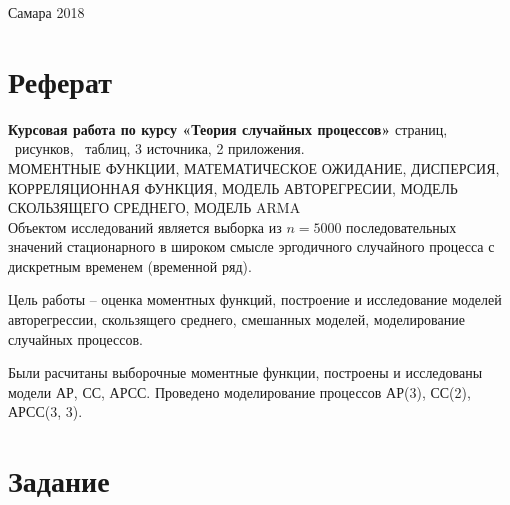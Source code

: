 \documentclass[12pt, fleqn]{article}
\begin{document}
\begin{titlepage}
						
							
	\vfill\vfill\vfill
					
	{\centering Самара 2018}
							
							
\end{titlepage}
\setcounter{page}{2}
\newpage
\section*{Реферат}
{
	\textbf{Курсовая работа по курсу «Теория случайных процессов»} 
	\pageref{LastPage} страниц,
	\totalfigures\ рисунков,
	\totaltables\ таблиц,
	3 источника,
	2 приложения.\\
				
	МОМЕНТНЫЕ ФУНКЦИИ, МАТЕМАТИЧЕСКОЕ ОЖИДАНИЕ, ДИСПЕРСИЯ, КОРРЕЛЯЦИОННАЯ ФУНКЦИЯ, МОДЕЛЬ АВТОРЕГРЕСИИ, МОДЕЛЬ СКОЛЬЗЯЩЕГО СРЕДНЕГО, МОДЕЛЬ ARMA\\
						  
	Объектом исследований является выборка из $n = 5000$ последовательных значений стационарного в широком смысле эргодичного случайного процесса с дискретным временем (временной ряд).
						  
	Цель работы -- оценка моментных функций, построение и исследование моделей авторегрессии, скользящего среднего, смешанных моделей, моделирование случайных процессов.
						  
	Были расчитаны выборочные моментные функции, построены и исследованы модели АР, СС, АРСС. Проведено моделирование процессов АР(3), СС(2), АРСС(3, 3).
}



\newpage
\tableofcontents
\newpage


\newpage
\section{Задание}
\end{document}

